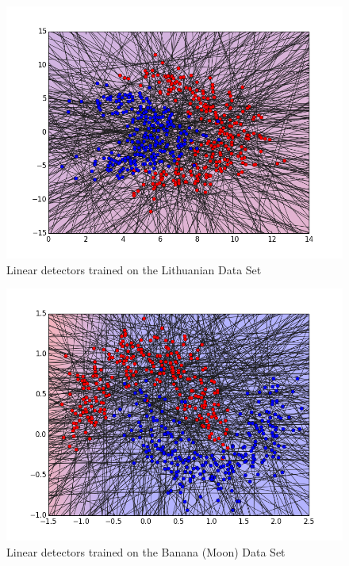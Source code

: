 \begin{figure}[H]
\centering
\includegraphics[scale=0.6]{figs/AllClassifiersLithuanian}
\caption{Linear detectors trained on the Lithuanian Data Set}
\label{Figure::lithuanian_all}
\end{figure}

\begin{figure}[H]
\centering
\includegraphics[scale=0.6]{figs/AllClassifiersBanana}
\caption{Linear detectors trained on the Banana (Moon) Data Set}
\label{Figure::banana_all}
\end{figure}

